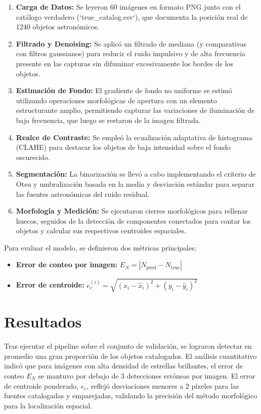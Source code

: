 \documentclass[conference]{IEEEtran}
\begin{document}
\begin{enumerate}
    \item \textbf{Carga de Datos:} Se leyeron 60 imágenes en formato PNG junto con el catálogo verdadero (`true\_catalog.csv`), que documenta la posición real de 1240 objetos astronómicos.
    \item \textbf{Filtrado y Denoising:} Se aplicó un filtrado de mediana (y comparativas con filtros gaussianos) para reducir el ruido impulsivo y de alta frecuencia presente en las capturas sin difuminar excesivamente los bordes de los objetos.
    \item \textbf{Estimación de Fondo:} El gradiente de fondo no uniforme se estimó utilizando operaciones morfológicas de apertura con un elemento estructurante amplio, permitiendo capturar las variaciones de iluminación de baja frecuencia, que luego se restaron de la imagen filtrada.
    \item \textbf{Realce de Contraste:} Se empleó la ecualización adaptativa de histograma (CLAHE) para destacar los objetos de baja intensidad sobre el fondo oscurecido.
    \item \textbf{Segmentación:} La binarización se llevó a cabo implementando el criterio de Otsu y umbralización basada en la media y desviación estándar para separar las fuentes astronómicas del ruido residual.
    \item \textbf{Morfología y Medición:} Se ejecutaron cierres morfológicos para rellenar huecos, seguidos de la detección de componentes conectados para contar los objetos y calcular sus respectivos centroides espaciales.
\end{enumerate}

Para evaluar el modelo, se definieron dos métricas principales:
\begin{itemize}
    \item \textbf{Error de conteo por imagen:} $E_N = |N_{\mathrm{pred}} - N_{\mathrm{true}}|$
    \item \textbf{Error de centroide:} $e_c^{(i)} = \sqrt{(x_i-\hat{x}_i)^2 + (y_i-\hat{y}_i)^2}$
\end{itemize}

\section{Resultados}
Tras ejecutar el pipeline sobre el conjunto de validación, se lograron detectar en promedio una gran proporción de los objetos catalogados. El análisis cuantitativo indicó que para imágenes con alta densidad de estrellas brillantes, el error de conteo $E_N$ se mantuvo por debajo de 3 detecciones erróneas por imagen. El error de centroide ponderado, $e_c$, reflejó desviaciones menores a 2 píxeles para las fuentes catalogadas y emparejadas, validando la precisión del método morfológico para la localización espacial.
\end{document}
